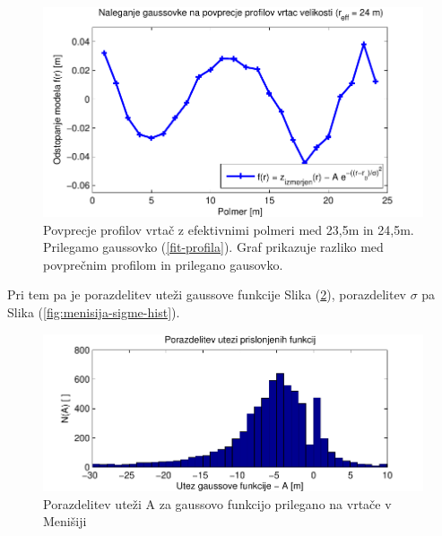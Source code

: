 \documentclass[a4paper, oneside, 12pt]{book}
\begin{document}
\begin{figure}[H]
  \centering
  \includegraphics{slike/menisija-profil-21-fit}
  \caption{Povprecje profilov vrtač z efektivnimi polmeri med 23,5m in 24,5m. Prilegamo gaussovko (\ref{fit-profila}). Graf prikazuje razliko med povprečnim profilom in prilegano gausovko.}
  \label{fig:menisija-profil-21-fit}
\end{figure}

Pri tem pa je porazdelitev uteži gaussove funkcije Slika (\ref{fig:menisija-globine-hist}), porazdelitev $\sigma$ pa Slika (\ref{fig:menisija-sigme-hist}).

\begin{figure}[H]
  \begin{center}
    \includegraphics{slike/menisija-globine-hist}
  \end{center}
  \caption{Porazdelitev uteži A za gaussovo funkcijo prilegano na vrtače v Menišiji}
  \label{fig:menisija-globine-hist}
\end{figure}
\end{document}
